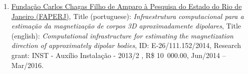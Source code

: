 \documentclass[11pt,a4paper,onecolumn]{article}
\newcommand{\FundingEntry}[9]{
	\noindent #1, Title (#2): \textit{#3}, Title (#4): \textit{#5}, ID: #6, Research grant: #7, R\$ #8, #9.}
\begin{document}
\begin{enumerate}[leftmargin=*, label=\textbf{(\arabic*)}]
	\item\FundingEntry{\href{https://www.faperj.br/}{Funda\c{c}\~{a}o Carlos Chagas Filho de Amparo \`{a} Pesquisa do Estado do Rio de Janeiro (FAPERJ)}}{portuguese}{Infraestrutura computacional para a estima\c{c}\~{a}o da magnetiza\c{c}\~{a}o de corpos 3D aproximadamente dipolares}{english}{Computational infrastructure for estimating the magnetization direction of approximately dipolar bodies}{E-26/111.152/2014}{INST - Aux{\' i}lio Instala{\c c}{\~ a}o - 2013/2 }{10~000.00}{Jun/2014 -- Mar/2016}
	
\end{enumerate}


{}
\end{document}
